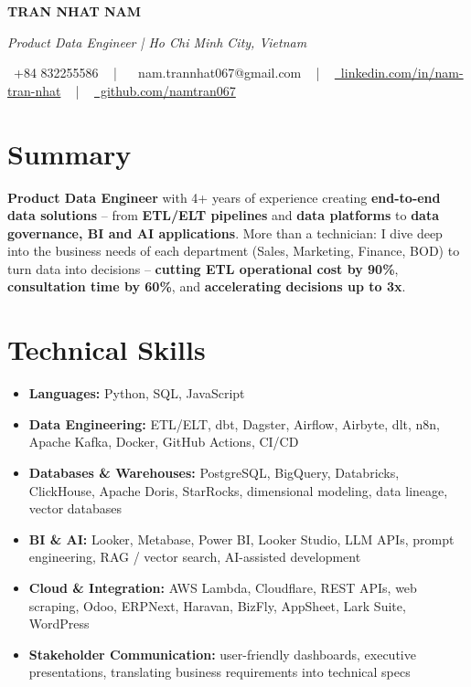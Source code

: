 \documentclass[letterpaper,10pt]{article}
\newcommand{\documentTitle}[2]{
  \begin{center}
    {\Huge\bfseries #1}
    \vspace{10pt}
    \footnotesize{#2}
    \vspace{2pt}
  \end{center}
}
\begin{document}

\documentTitle{TRAN NHAT NAM}{
\vspace{3pt}

{\large\color{gray}\itshape Product Data Engineer | Ho Chi Minh City, Vietnam}

\vspace{10pt}

{
  \raisebox{-0.05\height} \faPhone\ +84 832255586} ~ | ~
{
  \raisebox{-0.15\height} \faEnvelope\ nam.trannhat067@gmail.com} ~ | ~
\href{https://www.linkedin.com/in/nam-tran-nhat/}{
  \raisebox{-0.15\height} \faLinkedin\ linkedin.com/in/nam-tran-nhat} ~ | ~
\href{https://github.com/namtran067}{
  \raisebox{-0.15\height} \faGithub\ github.com/namtran067}
}


\section{Summary}
\textbf{Product Data Engineer} with 4+ years of experience creating \textbf{end-to-end data solutions} -- from \textbf{ETL/ELT pipelines} and \textbf{data platforms} to \textbf{data governance, BI and AI applications}. More than a technician: I dive deep into the business needs of each department (Sales, Marketing, Finance, BOD) to turn data into decisions -- \textbf{cutting ETL operational cost by 90\%}, \textbf{consultation time by 60\%}, and \textbf{accelerating decisions up to 3x}.


\section{Technical Skills}
\begin{itemize}[leftmargin=30pt, label=\textbullet, itemsep=1pt]
  \item \textbf{Languages:} Python, SQL, JavaScript
  \item \textbf{Data Engineering:} ETL/ELT, dbt, Dagster, Airflow, Airbyte, dlt, n8n, Apache Kafka, Docker, GitHub Actions, CI/CD
  \item \textbf{Databases \& Warehouses:} PostgreSQL, BigQuery, Databricks, ClickHouse, Apache Doris, StarRocks, dimensional modeling, data lineage, vector databases
  \item \textbf{BI \& AI:} Looker, Metabase, Power BI, Looker Studio, LLM APIs, prompt engineering, RAG / vector search, AI-assisted development
  \item \textbf{Cloud \& Integration:} AWS Lambda, Cloudflare, REST APIs, web scraping, Odoo, ERPNext, Haravan, BizFly, AppSheet, Lark Suite, WordPress
  \item \textbf{Stakeholder Communication:} user-friendly dashboards, executive presentations, translating business requirements into technical specs
\end{itemize}
\end{document}
